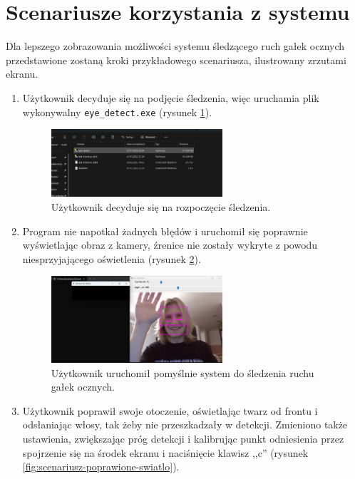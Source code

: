 \documentclass[a4paper,twoside,12pt]{book}
\begin{document}
\section{Scenariusze korzystania z systemu}
\label{Scenariusze-korzystania-z-systemu}

Dla lepszego zobrazowania możliwości systemu śledzącego ruch gałek ocznych przedstawione zostaną kroki przykładowego scenariusza, ilustrowany zrzutami ekranu. 

\begin{enumerate}
	\item Użytkownik decyduje się na podjęcie śledzenia, więc uruchamia plik wykonywalny \texttt{eye\_\-detect.exe} (rysunek \ref{fig:scenariusz-odpalanie-sledzenia}).

	\begin{figure}[H]
		\centering
		\includegraphics[width=0.6\textwidth]{pic/scenariusz/odpalamy śledzenie.png}
		\caption{Użytkownik decyduje się na rozpoczęcie śledzenia.}
		\label{fig:scenariusz-odpalanie-sledzenia}
	\end{figure}

	\item Program nie napotkał żadnych błędów i uruchomił się poprawnie wyświetlając obraz z kamery, źrenice nie zostały wykryte z powodu niesprzyjającego oświetlenia (rysunek \ref{fig:scenariusz-siema}).
	
	\begin{figure}[H]
		\centering
		\includegraphics[width=0.6\textwidth]{pic/scenariusz/śledzenie start.png}
		\caption{Użytkownik uruchomił pomyślnie system do śledzenia ruchu gałek ocznych.}
		\label{fig:scenariusz-siema}
	\end{figure}

	\item Użytkownik poprawił swoje otoczenie, oświetlając twarz od frontu i odsłaniając włosy, tak żeby nie przeszkadzały w detekcji. Zmieniono także ustawienia, zwiększając próg detekcji i kalibrując punkt odniesienia przez spojrzenie się na środek ekranu i naciśnięcie klawisz ,,c'' (rysunek \ref{fig:scenariusz-poprawione-swiatlo}).
	

\end{enumerate}
\end{document}
